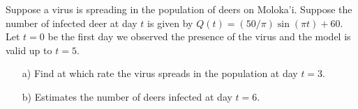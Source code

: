 \documentclass[12pt,a4paper]{article}
\newcounter{example}[section]
\begin{document}
\vspace*{16pt}
	
\begin{example}
Suppose a virus is spreading in the population of deers on Moloka'i. Suppose the number of infected deer at day $t$ is given by $Q(t) = (50/\pi ) \sin (\pi t) + 60$. Let $t = 0$ be the first day we observed the presence of the virus and the model is valid up to $t = 5$.
	\begin{enumerate}
	\item[a)] Find at which rate the virus spreads in the population at day $t = 3$.
	\item[b)] Estimates the number of deers infected at day $t = 6$.
	\end{enumerate}
\end{example}
\end{document}

